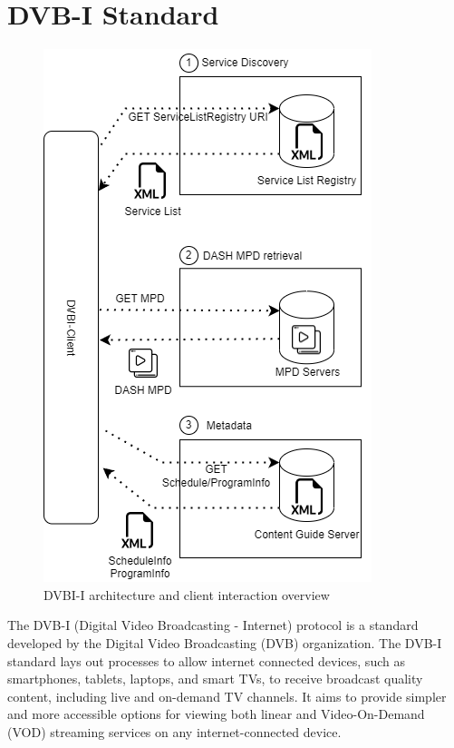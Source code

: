 \documentclass[conference]{IEEEtran}
\begin{document}
\section{DVB-I Standard}

\begin{figure}[ht]
	\centerline{\includegraphics[width=\linewidth]{figures/DVBI-architecture.png}}
	\caption{DVBI-I architecture and client interaction overview}
	\label{dvbi-architecture}
\end{figure}

The DVB-I (Digital Video Broadcasting - Internet) \cite{DVBI-I} protocol is a standard developed by the Digital Video Broadcasting (DVB) \cite{DVB} organization. The DVB-I standard lays out processes to allow internet connected devices, such as smartphones, tablets, laptops, and smart TVs, to receive broadcast quality content, including live and on-demand TV channels. It aims to provide simpler and more accessible options for viewing both linear and Video-On-Demand (VOD) streaming services on any internet-connected device.
\end{document}

